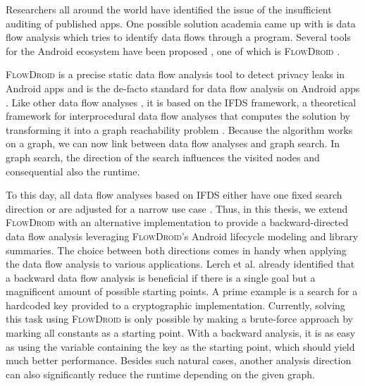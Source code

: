 \documentclass[../draft.tex]{subfiles}
\begin{document}
    Researchers all around the world have identified the issue of the insufficient auditing of published apps.
    One possible solution academia came up with is data flow analysis which tries to identify data flows through a program.
    Several tools for the Android ecosystem have been proposed \cite{Gibler2012, Zhao2012, Yang2012, Mann2012}, one of which is \textsc{FlowDroid} \cite{Arzt2014}.

    \textsc{FlowDroid} is a precise static data flow analysis tool to detect privacy leaks in Android apps and is the de-facto standard for data flow analysis on Android apps \cite{Arzt2014}.
    Like other data flow analyses \cite{Lerch2014,NguyenQuangDo2017,Allen2021}, it is based on the IFDS framework, a theoretical framework for interprocedural data flow analyses that computes the solution by transforming it into a graph reachability problem \cite{Reps1995}.
    Because the algorithm works on a graph, we can now link between data flow analyses and graph search.
    In graph search, the direction of the search influences the visited nodes and consequential also the runtime.

    To this day, all data flow analyses based on IFDS either have one fixed search direction \cite{Arzt2014,Allen2021,NguyenQuangDo2017} or are adjusted for a narrow use case \cite{Lerch2014}. 
    Thus, in this thesis, we extend \textsc{FlowDroid} with an alternative implementation to provide a backward-directed data flow analysis leveraging \textsc{FlowDroid}'s Android lifecycle modeling and library summaries.
    The choice between both directions comes in handy when applying the data flow analysis to various applications. Lerch et al.\cite{Lerch2014} already identified that a backward data flow analysis is beneficial if there is a single goal but a magnificent amount of possible starting points.
    A prime example is a search for a hardcoded key provided to a cryptographic implementation.
    Currently, solving this task using \textsc{FlowDroid} is only possible by making a brute-force approach by marking all constants as a starting point.
    With a backward analysis, it is as easy as using the variable containing the key as the starting point, which should yield much better performance.
    Besides such natural cases, another analysis direction can also significantly reduce the runtime depending on the given graph.
\end{document}
